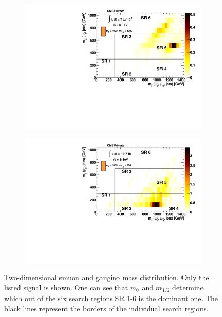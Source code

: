 \begin{figure}[ht!]
  \centering
  \begin{subfigure}[b]{0.6\textwidth}
    \centering
    \includegraphics[width=\textwidth]{plots/signal_1000_1200_m_smu_chi.pdf}
    \caption{\label{fig:sig-1000-1200-m-smu-chi}}
  \end{subfigure}
  \begin{subfigure}[b]{0.6\textwidth}
    \centering
    \includegraphics[width=\textwidth]{plots/signal_1000_200_m_smu_chi.pdf}
    \caption{\label{fig:sig-1000-200-m-smu-chi}}
  \end{subfigure}
  \caption{Two-dimensional smuon and gaugino mass distribution. Only the listed signal is shown. One can see that $m_0$ and $m_{1/2}$ determine which out of the six search regions SR 1-6 is the dominant one. The black lines represent the borders of the individual search regions.}
  \label{fig:sig-m-smu-chi}
\end{figure}

